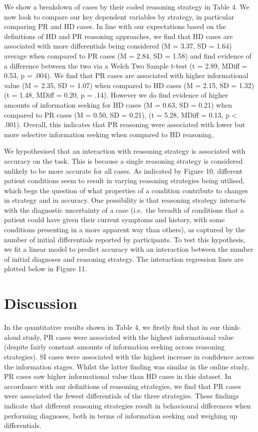 \documentclass[a4paper, nobind]{templates/ociamthesis}
\begin{document}
We show a breakdown of cases by their coded reasoning strategy in Table 4. We now look to compare our key dependent variables by strategy, in particular comparing PR and HD cases. In line with our expectations based on the definitions of HD and PR reasoning approaches, we find that HD cases are associated with more differentials being considered (M = 3.37, SD = 1.64) average when compared to PR cases (M = 2.84, SD = 1.58) and find evidence of a difference between the two via a Welch Two Sample t-test (t = 2.89, MDiff = 0.53, p = .004). We find that PR cases are associated with higher informational value (M = 2.35, SD = 1.07) when compared to HD cases (M = 2.15, SD = 1.32) (t = 1.48, MDiff = 0.20, p = .14). However we do find evidence of higher amounts of information seeking for HD cases (M = 0.63, SD = 0.21) when compared to PR cases (M = 0.50, SD = 0.21), (t = 5.28, MDiff = 0.13, p \textless{} .001). Overall, this indicates that PR reasoning were associated with lower but more selective information seeking when compared to HD reasoning.

We hypothesised that an interaction with reasoning strategy is associated with accuracy on the task. This is because a single reasoning strategy is considered unlikely to be more accurate for all cases. As indicated by Figure 10, different patient conditions seem to result in varying reasoning strategies being utilised, which begs the question of what properties of a condition contribute to changes in strategy and in accuracy. One possibility is that reasoning strategy interacts with the diagnostic uncertainty of a case (i.e.~the breadth of conditions that a patient could have given their current symptoms and history, with some conditions presenting in a more apparent way than others), as captured by the number of initial differentials reported by participants. To test this hypothesis, we fit a linear model to predict accuracy with an interaction between the number of initial diagnoses and reasoning strategy. The interaction regression lines are plotted below in Figure 11.

\hypertarget{discussion-1}{%
\section*{Discussion}\label{discussion-1}}

In the quantitative results shown in Table 4, we firstly find that in our think-aloud study, PR cases were associated with the highest informational value (despite fairly constant amounts of information seeking across reasoning strategies). SI cases were associated with the highest increase in confidence across the information stages. Whilst the latter finding was similar in the online study, PR cases saw higher informational value than HD cases in this dataset. In accordance with our definitions of reasoning strategies, we find that PR cases were associated the fewest differentials of the three strategies. These findings indicate that different reasoning strategies result in behavioural differences when performing diagnoses, both in terms of information seeking and weighing up differentials.
\end{document}

